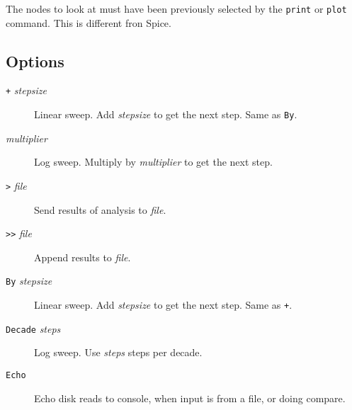 The nodes to look at must have been previously selected by the {\tt print} or
{\tt plot} command.  This is different fron Spice.
\subsection{Options}

\begin{description}

\item[{\tt +} {\it stepsize}] Linear sweep.  Add {\it
stepsize} to get the next step.  Same as {\tt By}.

\item[{\tt *} {\it multiplier}] Log sweep.  Multiply by
{\it multiplier} to get the next step.


\item[{\tt >} {\it file}] Send results of analysis to {\it file}.

\item[{\tt >>} {\it file}] Append results to {\it file}.



\item[{\tt By} {\it stepsize}] Linear sweep.  Add {\it
stepsize} to get the next step.  Same as {\tt +}.




\item[{\tt Decade} {\it steps}] Log sweep.  Use {\it
steps} steps per decade.

\item[{\tt Echo}] Echo disk reads to console, when input
is from a file, or doing compare.


\end{description}
